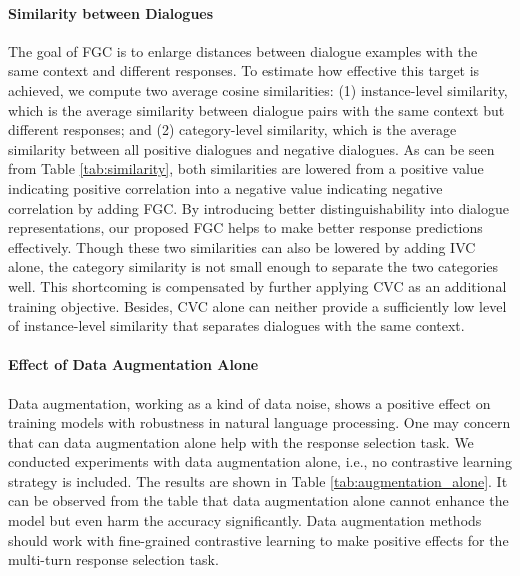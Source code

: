 \documentclass[letterpaper]{article} \usepackage{aaai22}  \usepackage{times}  \usepackage{helvet}  \usepackage{courier}  \usepackage[hyphens]{url}  \usepackage{graphicx} \urlstyle{rm} \def\UrlFont{\rm}  \usepackage{natbib}  \usepackage{caption} \DeclareCaptionStyle{ruled}{labelfont=normalfont,labelsep=colon,strut=off} \frenchspacing  \setlength{\pdfpagewidth}{8.5in}  \setlength{\pdfpageheight}{11in}  \usepackage{algorithm}
\begin{document}
\paragraph{Similarity between Dialogues}

\begin{table}[htbp]
\centering
{}
\caption{Similarity Analysis on the Ubuntu corpus.}
\label{tab:similarity}
\end{table}

The goal of FGC is to enlarge distances between dialogue examples with the same context and different responses. To estimate how effective this target is achieved, we compute two average cosine similarities: (1) instance-level similarity, which is the average similarity between dialogue pairs with the same context but different responses; and (2) category-level similarity, which is the average similarity between all positive dialogues and negative dialogues. As can be seen from Table \ref{tab:similarity}, both similarities are lowered from a positive value indicating positive correlation into a negative value indicating negative correlation by adding FGC. By introducing better distinguishability into dialogue representations, our proposed FGC helps to make better response predictions effectively. Though these two similarities can also be lowered by adding IVC alone, the category similarity is not small enough to separate the two categories well. This shortcoming is compensated by further applying CVC as an additional training objective.
Besides, CVC alone can neither provide a sufficiently low level of instance-level similarity that separates dialogues with the same context.

\paragraph{Effect of Data Augmentation Alone}
Data augmentation, working as a kind of data noise, shows a positive effect on training models with robustness in natural language processing. One may concern that can data augmentation alone help with the response selection task. We conducted experiments with data augmentation alone, i.e., no contrastive learning strategy is included. The results are shown in Table \ref{tab:augmentation_alone}. It can be observed from the table that data augmentation alone cannot enhance the model but even harm the accuracy significantly.
Data augmentation methods should work with fine-grained contrastive learning to make positive effects for the multi-turn response selection task.
\end{document}
